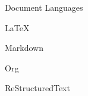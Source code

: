 \begin{skillset}{Document Languages}
  \item LaTeX
  \item Markdown
  \item Org
  \item ReStructuredText
\end{skillset}
